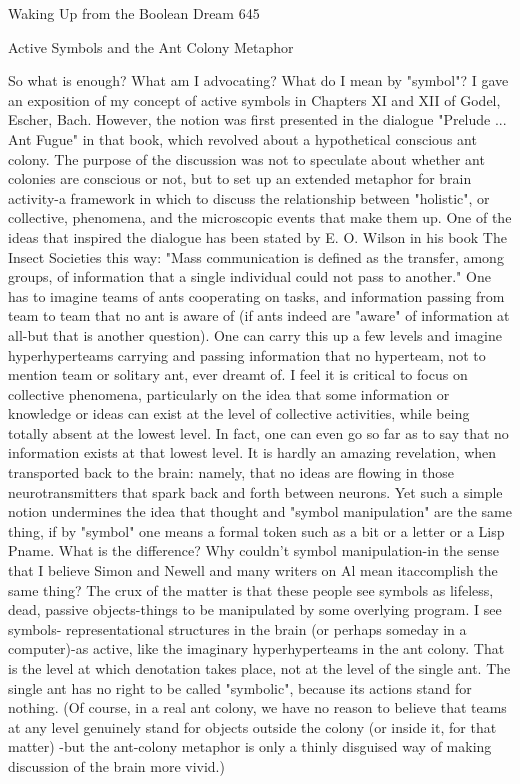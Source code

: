 Waking Up from the Boolean Dream                                                       645

                   Active Symbols and the Ant Colony Metaphor

        So what is enough? What am I advocating? What do I mean by "symbol"? I
gave an exposition of my concept of active symbols in Chapters XI and XII of Godel,
Escher, Bach. However, the notion was first presented in the dialogue "Prelude ... Ant
Fugue" in that book, which revolved about a hypothetical conscious ant colony. The
purpose of the discussion was not to speculate about whether ant colonies are
conscious or not, but to set up an extended metaphor for brain activity-a framework in
which to discuss the relationship between "holistic", or collective, phenomena, and
the microscopic events that make them up.
        One of the ideas that inspired the dialogue has been stated by E. O. Wilson in
his book The Insect Societies this way: "Mass communication is defined as the
transfer, among groups, of information that a single individual could not pass to
another." One has to imagine teams of ants cooperating on tasks, and information
passing from team to team that no ant is aware of (if ants indeed are "aware" of
information at all-but that is another question). One can carry this up a few levels and
imagine hyperhyperteams carrying and passing information that no hyperteam, not to
mention team or solitary ant, ever dreamt of.
        I feel it is critical to focus on collective phenomena, particularly on the idea
that some information or knowledge or ideas can exist at the level of collective
activities, while being totally absent at the lowest level. In fact, one can even go so far
as to say that no information exists at that lowest level. It is hardly an amazing
revelation, when transported back to the brain: namely, that no ideas are flowing in
those neurotransmitters that spark back and forth between neurons. Yet such a simple
notion undermines the idea that thought and "symbol manipulation" are the same
thing, if by "symbol" one means a formal token such as a bit or a letter or a Lisp
Pname.
        What is the difference? Why couldn't symbol manipulation-in the sense that I
believe Simon and Newell and many writers on Al mean itaccomplish the same thing?
The crux of the matter is that these people see symbols as lifeless, dead, passive
objects-things to be manipulated by some overlying program. I see symbols-
representational structures in the brain (or perhaps someday in a computer)-as active,
like the imaginary hyperhyperteams in the ant colony. That is the level at which
denotation takes place, not at the level of the single ant. The single ant has no right to
be called "symbolic", because its actions stand for nothing. (Of course, in a real ant
colony, we have no reason to believe that teams at any level genuinely stand for
objects outside the colony (or inside it, for that matter) -but the ant-colony metaphor
is only a thinly disguised way of making discussion of the brain more vivid.)




